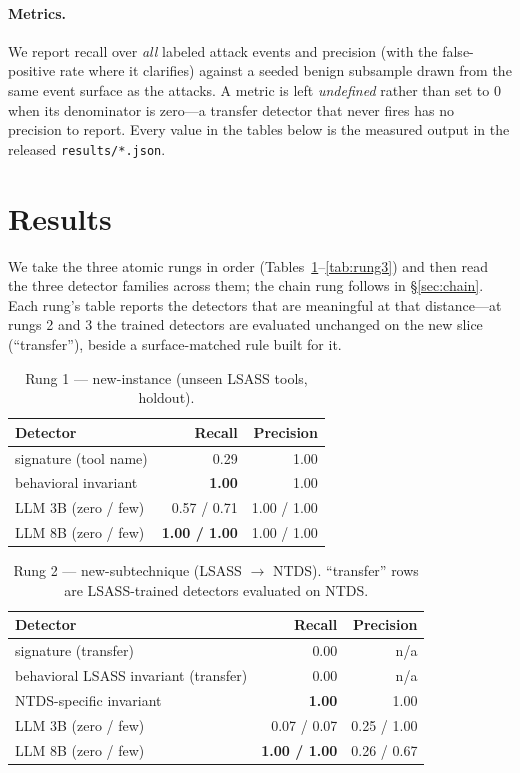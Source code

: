 \documentclass[sigconf,nonacm]{acmart}
\begin{document}
\paragraph{Metrics.}
We report recall over \emph{all} labeled attack events and precision (with the
false-positive rate where it clarifies) against a seeded benign subsample drawn
from the same event surface as the attacks. A metric is left \emph{undefined}
rather than set to $0$ when its denominator is zero---a transfer detector that
never fires has no precision to report. Every value in the tables below is the
measured output in the released \texttt{results/*.json}.

\section{Results}
\label{sec:results}
We take the three atomic rungs in order (Tables~\ref{tab:rung1}--\ref{tab:rung3})
and then read the three detector families across them; the chain rung follows in
\S\ref{sec:chain}. Each rung's table reports the detectors that are meaningful at
that distance---at rungs 2 and 3 the trained detectors are evaluated unchanged on
the new slice (``transfer''), beside a surface-matched rule built for it.

\begin{table}[t]
\caption{Rung 1 --- new-instance (unseen LSASS tools, holdout).}
\label{tab:rung1}
\small
\begin{tabular}{@{}lrr@{}}
\toprule
Detector & Recall & Precision \\
\midrule
signature (tool name)            & 0.29 & 1.00 \\
behavioral invariant             & \textbf{1.00} & 1.00 \\
LLM 3B (zero / few)              & 0.57 / 0.71 & 1.00 / 1.00 \\
LLM 8B (zero / few)              & \textbf{1.00 / 1.00} & 1.00 / 1.00 \\
\bottomrule
\end{tabular}
\end{table}

\begin{table}[t]
\caption{Rung 2 --- new-subtechnique (LSASS $\rightarrow$ NTDS). ``transfer''
rows are LSASS-trained detectors evaluated on NTDS.}
\label{tab:rung2}
\small
\begin{tabular}{@{}lrr@{}}
\toprule
Detector & Recall & Precision \\
\midrule
signature (transfer)             & 0.00 & n/a \\
behavioral LSASS invariant (transfer) & 0.00 & n/a \\
NTDS-specific invariant          & \textbf{1.00} & 1.00 \\
LLM 3B (zero / few)              & 0.07 / 0.07 & 0.25 / 1.00 \\
LLM 8B (zero / few)              & \textbf{1.00 / 1.00} & 0.26 / 0.67 \\
\bottomrule
\end{tabular}
\end{table}
\end{document}
